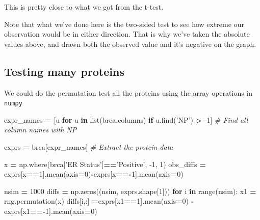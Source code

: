 \documentclass[
  letterpaper,
]{scrbook}
\newenvironment{Shaded}{\begin{snugshade}}{\end{snugshade}}
\newcommand{\BuiltInTok}[1]{#1}
\newcommand{\CommentTok}[1]{\textcolor[rgb]{0.56,0.35,0.01}{\textit{#1}}}
\newcommand{\ControlFlowTok}[1]{\textcolor[rgb]{0.13,0.29,0.53}{\textbf{#1}}}
\newcommand{\DecValTok}[1]{\textcolor[rgb]{0.00,0.00,0.81}{#1}}
\newcommand{\KeywordTok}[1]{\textcolor[rgb]{0.13,0.29,0.53}{\textbf{#1}}}
\newcommand{\NormalTok}[1]{#1}
\newcommand{\OperatorTok}[1]{\textcolor[rgb]{0.81,0.36,0.00}{\textbf{#1}}}
\newcommand{\StringTok}[1]{\textcolor[rgb]{0.31,0.60,0.02}{#1}}
\begin{document}
This is pretty close to what we got from the t-test.

Note that what we've done here is the two-sided test to see how extreme our observation would be in either direction. That is why we've taken the absolute values above, and drawn both the
observed value and it's negative on the graph.

\hypertarget{testing-many-proteins}{%
\subsection{Testing many proteins}\label{testing-many-proteins}}

We could do the permutation test all the proteins using the array operations in \texttt{numpy}

\begin{Shaded}
\begin{Highlighting}[]
\NormalTok{expr_names }\OperatorTok{=}\NormalTok{ [u }\ControlFlowTok{for}\NormalTok{ u }\KeywordTok{in} \BuiltInTok{list}\NormalTok{(brca.columns) }\ControlFlowTok{if}\NormalTok{ u.find(}\StringTok{'NP'}\NormalTok{) }\OperatorTok{>} \DecValTok{-1}\NormalTok{] }
            \CommentTok{# Find all column names with NP}

\NormalTok{exprs }\OperatorTok{=}\NormalTok{ brca[expr_names] }\CommentTok{# Extract the protein data}
\end{Highlighting}
\end{Shaded}

\begin{Shaded}
\begin{Highlighting}[]
\NormalTok{x }\OperatorTok{=}\NormalTok{ np.where(brca[}\StringTok{'ER Status'}\NormalTok{]}\OperatorTok{==}\StringTok{'Positive'}\NormalTok{, }\DecValTok{-1}\NormalTok{, }\DecValTok{1}\NormalTok{)}
\NormalTok{obs_diffs }\OperatorTok{=}\NormalTok{ exprs[x}\OperatorTok{==}\DecValTok{1}\NormalTok{].mean(axis}\OperatorTok{=}\DecValTok{0}\NormalTok{)}\OperatorTok{-}\NormalTok{exprs[x}\OperatorTok{==-}\DecValTok{1}\NormalTok{].mean(axis}\OperatorTok{=}\DecValTok{0}\NormalTok{)}
\end{Highlighting}
\end{Shaded}

\begin{Shaded}
\begin{Highlighting}[]
\NormalTok{nsim }\OperatorTok{=} \DecValTok{1000}
\NormalTok{diffs }\OperatorTok{=}\NormalTok{ np.zeros((nsim, exprs.shape[}\DecValTok{1}\NormalTok{]))}
\ControlFlowTok{for}\NormalTok{ i }\KeywordTok{in} \BuiltInTok{range}\NormalTok{(nsim):}
\NormalTok{    x1 }\OperatorTok{=}\NormalTok{ rng.permutation(x)}
\NormalTok{    diffs[i,:] }\OperatorTok{=}\NormalTok{exprs[x1}\OperatorTok{==}\DecValTok{1}\NormalTok{].mean(axis}\OperatorTok{=}\DecValTok{0}\NormalTok{) }\OperatorTok{-}\NormalTok{ exprs[x1}\OperatorTok{==-}\DecValTok{1}\NormalTok{].mean(axis}\OperatorTok{=}\DecValTok{0}\NormalTok{)}
\end{Highlighting}
\end{Shaded}
\end{document}
